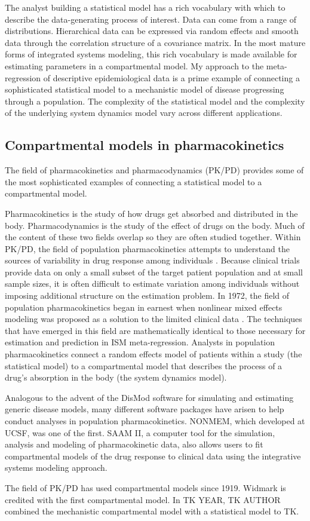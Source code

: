 The analyst building a statistical model has a rich vocabulary with
which to describe the data-generating process of interest. Data can
come from a range of distributions. Hierarchical data can be expressed
via random effects and smooth data through the correlation structure
of a covariance matrix. In the most mature forms of integrated systems
modeling, this rich vocabulary is made available for estimating
parameters in a compartmental model. My approach to the meta-regression of descriptive epidemiological data is a prime example of
connecting a sophisticated statistical model to a mechanistic model of disease progressing
through a population. The complexity of the statistical model and the
complexity of the underlying system dynamics model vary across
different applications.

\subsection{Compartmental models in pharmacokinetics}
The field of pharmacokinetics and pharmacodynamics (PK/PD) provides
some of the most sophisticated examples of connecting a statistical
model to a compartmental model.

Pharmacokinetics is the study of how drugs get absorbed and
distributed in the body. Pharmacodynamics is the study of the effect
of drugs on the body. Much of the content of these two fields overlap
so they are often studied together. Within PK/PD, the field of
population pharmacokinetics attempts to understand the sources of
variability in drug response among individuals
\cite{Yuh_Population_1994}. Because clinical trials provide data on
only a small subset of the target patient population and at small
sample sizes, it is often difficult to estimate variation among
individuals without imposing additional structure on the estimation
problem. In 1972, the field of population pharmacokinetics began in
earnest when nonlinear mixed effects modeling was proposed as a
solution to the limited clinical data
\cite{Sheiner_Modelling_1972}. The techniques that have emerged in
this field are mathematically identical to those necessary for estimation and prediction
in ISM meta-regression. Analysts in
population pharmacokinetics connect a random effects model of patients
within a study (the statistical model) to a compartmental model that
describes the process of a drug's absorption in the body (the system dynamics model).

Analogous to the advent of the DisMod software for simulating and
estimating generic disease models, many different software packages
have arisen to help conduct analyses in population
pharmacokinetics. NONMEM, which developed at UCSF, was one of the
first.\cite{Beal_NONMEM_2009} SAAM II, a computer tool for the
simulation, analysis and modeling of pharmacokinetic data, also allows
users to fit compartmental models of the drug response to clinical
data using the integrative systems modeling
approach.\cite{Barrett_SAAM_1998}

The field of PK/PD has used compartmental models since 1919.  Widmark is credited with the first compartmental model. \cite{atkinson_introduction_2007}  In TK YEAR, TK AUTHOR combined the mechanistic compartmental model with a statistical model to TK.




